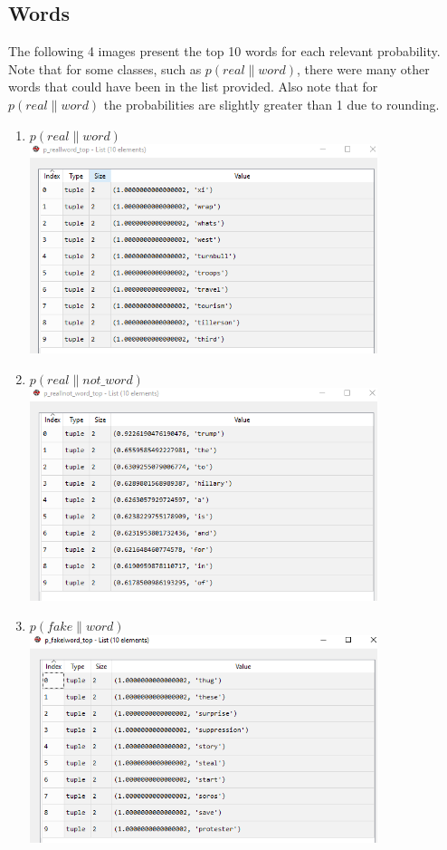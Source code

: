 \documentclass{article}
\begin{document}
   \subsection{Words}
   The following 4 images present the top 10 words for each relevant probability. Note that for some classes,
   such as $p(real \| word)$, there were many other words that could have been in the list provided. Also note
   that for $ p(real \| word)$ the probabilities are slightly greater than 1 due to rounding.
   \begin{enumerate}
   \item $p(real \| word)$
   \\
           \includegraphics[width=4in]{resources/part3/realword}

   \item $p(real \| not\_word)$
   \\
           \includegraphics[width=4in]{resources/part3/realnotword}

   \item $p(fake \| word)$
   \\
           \includegraphics[width=4in]{resources/part3/fakeword}


\end{enumerate}
\end{document}
